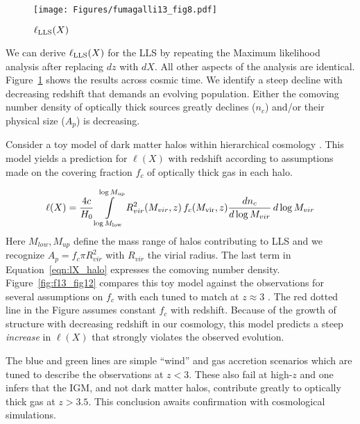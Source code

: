 \documentclass[graybox]{svmult}
\def\intl{\int\limits}
\begin{document}
%
\begin{figure}[b]
\sidecaption
\texttt{[image: Figures/fumagalli13\_fig8.pdf]}
%
%
\caption{$\ell_{\rm LLS}(X)$
}
\label{fig:lX_LLS}       %
\end{figure}

We can derive $\ell_{\rm LLS}(X)$ for the LLS by 
repeating the Maximum likelihood analysis after
replacing $dz$ with $dX$.  All other aspects of the 
analysis are identical.
Figure~\ref{fig:lX_LLS} shows the results across
cosmic time.
We identify a steep decline with decreasing
redshift that demands an evolving population.
Either the comoving number density of optically thick sources
greatly declines ($n_c$) and/or their physical size ($A_p$)
is decreasing.

Consider a toy model of dark matter halos within hierarchical
cosmology \cite{fop+13}.  This model yields a prediction for
$\ell(X)$ with redshift according to assumptions made on the
covering fraction $f_c$ of optically thick gas in each halo.

\begin{equation}
\ell(X) = \frac{4c}{H_0} \intl_{\log M_{\rm low}}^{\log M_{\rm up}}
R_{vir}^2 (M_{vir}, z) \, f_c(M_{\rm vir}, z) 
\frac{d n_c}{d \log M_{vir}} \, d\log M_{vir}
\label{eqn:lX_halo}
\end{equation}
Here $M_{low}, M_{up}$ define the mass range of halos contributing to LLS
and we recognize $A_p = f_c \pi R_{vir}^2$
with $R_{vir}$ the virial radius.
The last term in Equation~\ref{eqn:lX_halo}
expresses the comoving number density.
Figure~\ref{fig:f13_fig12} compares this toy model against
the observations for several assumptions on $f_c$ with each
tuned to match at $z \approx 3$
\cite{fop+13}.  The red dotted line in the Figure assumes
constant $f_c$ with redshift.  Because of the growth of
structure with decreasing redshift in our cosmology,
this model predicts a steep {\it increase} in $\ell(X)$
that strongly violates the observed evolution.

The blue and green lines are simple ``wind'' and gas accretion
scenarios which are tuned to describe the observations
at $z<3$. These also fail at high-$z$
and one infers that the IGM, and not dark matter halos, contribute
greatly to optically thick gas at $z>3.5$.
This conclusion awaits confirmation with cosmological simulations.
\end{document}
